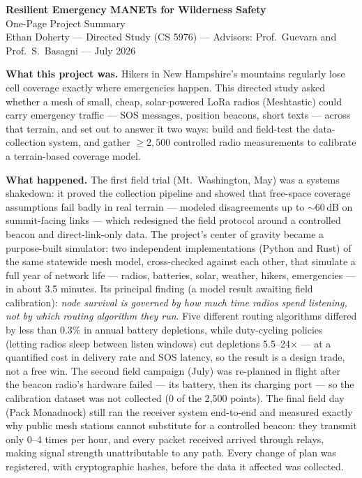 \documentclass[11pt]{article}
\begin{document}
\begin{center}
{\Large\textbf{Resilient Emergency MANETs for Wilderness Safety}}\\[3pt]
{\large One-Page Project Summary}\\[3pt]
{\small Ethan Doherty --- Directed Study (CS 5976) --- Advisors: Prof.~Guevara and Prof.~S.~Basagni --- July 2026}
\end{center}

\vspace{4pt}
\textbf{What this project was.}
Hikers in New Hampshire's mountains regularly lose cell coverage exactly where
emergencies happen. This directed study asked whether a mesh of small, cheap,
solar-powered LoRa radios (Meshtastic) could carry emergency traffic --- SOS
messages, position beacons, short texts --- across that terrain, and set out to
answer it two ways: build and field-test the data-collection system, and
gather ${\geq}2{,}500$ controlled radio measurements to calibrate a
terrain-based coverage model.

\textbf{What happened.}
The first field trial (Mt.~Washington, May) was a systems shakedown: it proved
the collection pipeline and showed that free-space coverage assumptions fail
badly in real terrain --- modeled disagreements up to ${\sim}60$\,dB on
summit-facing links --- which redesigned the field protocol around a
controlled beacon and direct-link-only data. The project's center of gravity
became a purpose-built simulator: two independent implementations (Python and
Rust) of the same statewide mesh model, cross-checked against each other, that
simulate a full year of network life --- radios, batteries, solar, weather,
hikers, emergencies --- in about 3.5 minutes. Its principal finding (a model
result awaiting field calibration): \emph{node survival is governed by how
much time radios spend listening, not by which routing algorithm they run}.
Five different routing algorithms differed by less than 0.3\% in annual
battery depletions, while duty-cycling policies (letting radios sleep between
listen windows) cut depletions 5.5--24$\times$ --- at a quantified cost in
delivery rate and SOS latency, so the result is a design trade, not a free
win. The second field campaign (July) was re-planned in flight after the
beacon radio's hardware failed --- its battery, then its charging port --- so
the calibration dataset was not collected (0 of the 2{,}500 points). The final
field day (Pack Monadnock) still ran the receiver system end-to-end and
measured exactly why public mesh stations cannot substitute for a controlled
beacon: they transmit only 0--4 times per hour, and every packet received
arrived through relays, making signal strength unattributable to any path.
Every change of plan was registered, with cryptographic hashes, before the
data it affected was collected.
\end{document}
